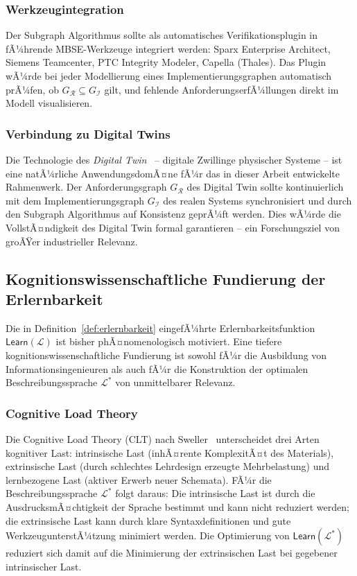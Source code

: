 ﻿\documentclass[a4paper,12pt]{article}
\theoremstyle{definition}
\begin{document}
\subsubsection{Werkzeugintegration}

Der Subgraph Algorithmus sollte als automatisches Verifikationsplugin in fÃ¼hrende
MBSE-Werkzeuge integriert werden: Sparx Enterprise Architect, Siemens Teamcenter,
PTC Integrity Modeler, Capella (Thales). Das Plugin wÃ¼rde bei jeder Modellierung
eines Implementierungsgraphen automatisch prÃ¼fen, ob $G_\mathcal{R} \subseteq G_\mathcal{I}$
gilt, und fehlende AnforderungserfÃ¼llungen direkt im Modell visualisieren.

\subsubsection{Verbindung zu Digital Twins}

Die Technologie des \emph{Digital Twin}~\cite{grieves2014} -- digitale Zwillinge
physischer Systeme -- ist eine natÃ¼rliche AnwendungsdomÃ¤ne fÃ¼r das in dieser Arbeit
entwickelte Rahmenwerk. Der Anforderungsgraph $G_\mathcal{R}$ des Digital Twin sollte
kontinuierlich mit dem Implementierungsgraph $G_\mathcal{I}$ des realen Systems
synchronisiert und durch den Subgraph Algorithmus auf Konsistenz geprÃ¼ft werden.
Dies wÃ¼rde die VollstÃ¤ndigkeit des Digital Twin formal garantieren -- ein Forschungsziel
von groÃŸer industrieller Relevanz.

\subsection{Kognitionswissenschaftliche Fundierung der Erlernbarkeit}

Die in Definition~\ref{def:erlernbarkeit} eingefÃ¼hrte Erlernbarkeitsfunktion
$\mathsf{Learn}(\mathcal{L})$ ist bisher phÃ¤nomenologisch motiviert. Eine tiefere
kognitionswissenschaftliche Fundierung ist sowohl fÃ¼r die Ausbildung von
Informationsingenieuren als auch fÃ¼r die Konstruktion der optimalen Beschreibungssprache
$\mathcal{L}^*$ von unmittelbarer Relevanz.

\subsubsection{Cognitive Load Theory}

Die Cognitive Load Theory (CLT) nach Sweller~\cite{sweller1988} unterscheidet drei
Arten kognitiver Last: intrinsische Last (inhÃ¤rente KomplexitÃ¤t des Materials),
extrinsische Last (durch schlechtes Lehrdesign erzeugte Mehrbelastung) und lernbezogene
Last (aktiver Erwerb neuer Schemata). FÃ¼r die Beschreibungssprache $\mathcal{L}^*$
folgt daraus: Die intrinsische Last ist durch die AusdrucksmÃ¤chtigkeit der Sprache
bestimmt und kann nicht reduziert werden; die extrinsische Last kann durch klare
Syntaxdefinitionen und gute WerkzeugunterstÃ¼tzung minimiert werden. Die Optimierung
von $\mathsf{Learn}(\mathcal{L}^*)$ reduziert sich damit auf die Minimierung der
extrinsischen Last bei gegebener intrinsischer Last.
\end{document}
